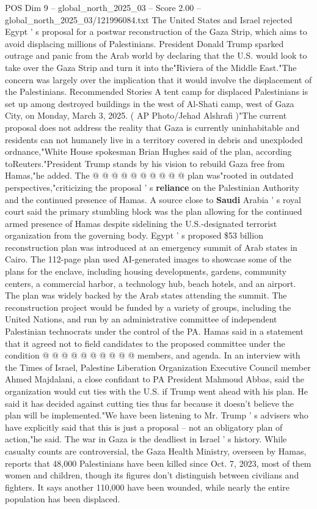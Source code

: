 \begin{textsample}{POS Dim 9 – global\_north\_2025\_03 – Score 2.00 – global\_north\_2025\_03/121996084.txt}  \label{ex:f9_pos_296}
The United States and Israel rejected Egypt ' s proposal for a postwar reconstruction of the Gaza Strip, which aims to avoid displacing millions of Palestinians.
President Donald Trump sparked outrage and panic from the Arab world by declaring that the U.S. would look to take over the Gaza Strip and turn it into the"Riviera of the Middle East."The concern was largely over the implication that it would involve the displacement of the Palestinians.
Recommended Stories A tent camp for displaced Palestinians is set up among destroyed buildings in the west of Al-Shati camp, west of Gaza City, on Monday, March 3, 2025. ( AP Photo/Jehad Alshrafi )"The current proposal does not address the reality that Gaza is currently uninhabitable and residents can not humanely live in a territory covered in debris and unexploded ordnance,"White House spokesman Brian Hughes said of the plan, according toReuters."President Trump stands by his vision to rebuild Gaza free from Hamas,"he added.
The @ @ @ @ @ @ @ @ @ @ plan was"rooted in outdated perspectives,"criticizing the proposal ' s \textbf{reliance} on the Palestinian Authority and the continued presence of Hamas.
A source close to \textbf{Saudi} Arabia ' s royal court said the primary stumbling block was the plan allowing for the continued armed presence of Hamas despite sidelining the U.S.-designated terrorist organization from the governing body.
Egypt ' s proposed \$53 billion reconstruction plan was introduced at an emergency summit of Arab states in Cairo.
The 112-page plan used AI-generated images to showcase some of the plans for the enclave, including housing developments, gardens, community centers, a commercial harbor, a technology hub, beach hotels, and an airport.
The plan was widely backed by the Arab states attending the summit.
The reconstruction project would be funded by a variety of groups, including the United Nations, and run by an administrative committee of independent Palestinian technocrats under the control of the PA.
Hamas said in a statement that it agreed not to field candidates to the proposed committee under the condition @ @ @ @ @ @ @ @ @ @ members, and agenda.
In an interview with the Times of Israel, Palestine Liberation Organization Executive Council member Ahmed Majdalani, a close confidant to PA President Mahmoud Abbas, said the organization would cut ties with the U.S. if Trump went ahead with his plan.
He said it has decided against cutting ties thus far because it doesn't believe the plan will be implemented."We have been listening to Mr.
Trump ' s advisers who have explicitly said that this is just a proposal -- not an obligatory plan of action,"he said.
The war in Gaza is the deadliest in Israel ' s history.
While casualty counts are controversial, the Gaza Health Ministry, overseen by Hamas, reports that 48,000 Palestinians have been killed since Oct. 7, 2023, most of them women and children, though its figures don't distinguish between civilians and fighters.
It says another 110,000 have been wounded, while nearly the entire population has been displaced.

\end{textsample}
